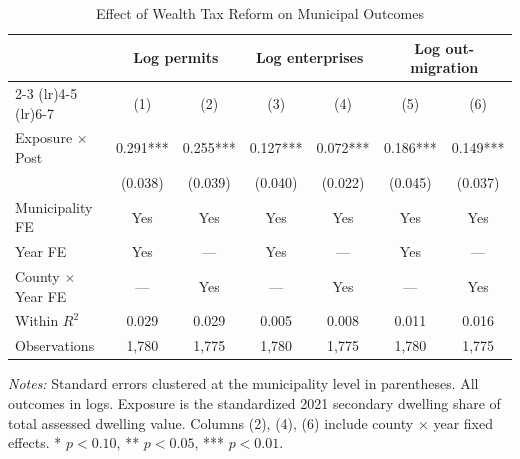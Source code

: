 \begin{table}[t]
\centering
\caption{Effect of Wealth Tax Reform on Municipal Outcomes}
\label{tab:main}
\begin{tabular}{lcccccc}
\hline\hline
 & \multicolumn{2}{c}{Log permits} & \multicolumn{2}{c}{Log enterprises} & \multicolumn{2}{c}{Log out-migration} \\
\cmidrule(lr){2-3} \cmidrule(lr){4-5} \cmidrule(lr){6-7}
 & (1) & (2) & (3) & (4) & (5) & (6) \\
\hline
Exposure $\times$ Post & 0.291*** & 0.255*** & 0.127*** & 0.072*** & 0.186*** & 0.149*** \\
 & (0.038) & (0.039) & (0.040) & (0.022) & (0.045) & (0.037) \\
\hline
Municipality FE & Yes & Yes & Yes & Yes & Yes & Yes \\
Year FE & Yes & --- & Yes & --- & Yes & --- \\
County $\times$ Year FE & --- & Yes & --- & Yes & --- & Yes \\
Within $R^2$ & 0.029 & 0.029 & 0.005 & 0.008 & 0.011 & 0.016 \\
Observations & 1,780 & 1,775 & 1,780 & 1,775 & 1,780 & 1,775 \\
\hline\hline
\end{tabular}
\begin{minipage}{0.95\textwidth}
\vspace{0.3em}
\footnotesize \textit{Notes:} Standard errors clustered at the municipality level in parentheses. All outcomes in logs. Exposure is the standardized 2021 secondary dwelling share of total assessed dwelling value. Columns (2), (4), (6) include county $\times$ year fixed effects. * $p<0.10$, ** $p<0.05$, *** $p<0.01$.
\end{minipage}
\end{table}

